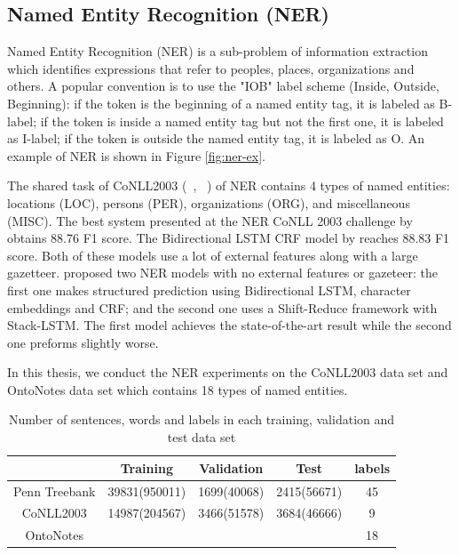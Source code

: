 \documentclass{sfuthesis}
\begin{document}
\subsection{Named Entity Recognition (NER)}

Named Entity Recognition (NER) is a sub-problem of
information extraction which identifies expressions
that refer to peoples, places, organizations and others. A popular convention is to use the "IOB" label scheme (Inside, Outside, Beginning): if the token is the beginning of a named entity tag, it is labeled as B-label; if the token is inside a named entity tag but not the first one, it is labeled as I-label; if the token is outside the named entity tag, it is labeled as O. An example of NER is shown in Figure \ref{fig:ner-ex}.

The shared task of CoNLL2003 (~\citeauthor{tjong2003introduction}, ~\citeyear{tjong2003introduction}) of NER contains 4 types of named entities: locations (LOC), persons (PER), organizations (ORG), and miscellaneous (MISC).
The best system presented at the NER CoNLL 2003 challenge by \cite{florian2003named} obtains 88.76 F1 score. The Bidirectional LSTM CRF model by \cite{huang2015bidirectional} reaches 88.83 F1 score. Both of these models use a lot of external features along with a large gazetteer. \cite{lample2016neural} proposed two NER models with no external features or gazeteer: the first one makes structured prediction using Bidirectional LSTM, character embeddings and CRF; and the second one uses a Shift-Reduce framework with Stack-LSTM. The first model achieves the state-of-the-art result while the second one preforms slightly worse. 


In this thesis, we conduct the NER experiments on the CoNLL2003 data set and OntoNotes data set which contains 18 types of named entities. 



\begin{table}[]
\centering
\caption{Number of sentences, words and labels in each training, validation and test data set}
\label{table:my-dataset}
\begin{tabular}{|c|c|c|c|c|} \hline
      & Training  & Validation  & Test  & labels  \\ \hline
Penn Treebank   &39831(950011) &1699(40068) &2415(56671) &45\\\hline
CoNLL2003   &14987(204567) &3466(51578) &3684(46666) &9     \\\hline
OntoNotes   & & & &18     \\\hline
\end{tabular}
\end{table}
\end{document}
